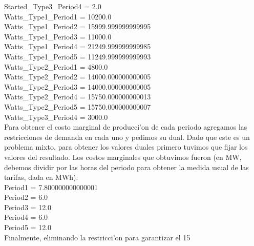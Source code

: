 Started\_Type3\_Period4 = 2.0\\
Watts\_Type1\_Period1 = 10200.0\\
Watts\_Type1\_Period2 = 15999.999999999995\\
Watts\_Type1\_Period3 = 11000.0\\
Watts\_Type1\_Period4 = 21249.999999999985\\
Watts\_Type1\_Period5 = 11249.999999999993\\
Watts\_Type2\_Period1 = 4800.0\\
Watts\_Type2\_Period2 = 14000.000000000005\\
Watts\_Type2\_Period3 = 14000.000000000005\\
Watts\_Type2\_Period4 = 15750.000000000013\\
Watts\_Type2\_Period5 = 15750.000000000007\\
Watts\_Type3\_Period4 = 3000.0\\
Para obtener el costo marginal de producci'on de cada periodo agregamos las restricciones de demanda en cada uno y pedimos su dual. Dado que este es un problema mixto, para obtener los valores duales primero tuvimos que fijar los valores del resultado. Los costos marginales que obtuvimos fueron (en MW, debemos dividir por las horas del periodo para obtener la medida usual de las tarifas, dada en MWh): \\
Period1 = 7.800000000000001\\
Period2 = 6.0\\
Period3 = 12.0\\
Period4 = 6.0\\
Period5 = 12.0\\
Finalmente, eliminando la restricci'on para garantizar el 15%